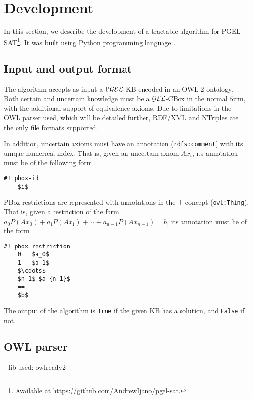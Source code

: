 
\chapter{Development}
\label{cap:development}

In this section, we describe the development of a tractable algorithm for PGEL-SAT\footnote{Available at \url{https://github.com/AndrewIjano/pgel-sat}.}. It was built using Python programming language \citep{python3}.

\section{Input and output format}

The algorithm accepts as input a $\text{P}\mathcal{GEL}$ KB encoded in an OWL 2 ontology. Both certain and uncertain knowledge must be a $\mathcal{GEL}$-CBox in the normal form, with the additional support of equivalence axioms. Due to limitations in the OWL parser used, which will be detailed further, RDF/XML and NTriples are the only file formats supported.

In addition, uncertain axioms must have an annotation (\texttt{rdfs:comment}) with its unique numerical index. That is, given an uncertain axiom $Ax_i$, its annotation must be of the following form
\begin{lstlisting}[style=mystyle]
	#! pbox-id
	$i$
\end{lstlisting}

PBox restrictions are represented with annotations in the $\top$ concept (\texttt{owl:Thing}). That is, given a restriction of the form $a_0 P(Ax_0) + a_1P(Ax_1) + \cdots + a_{n-1} P(Ax_{n-1}) = b$, its annotation must be of the form
\begin{lstlisting}[style=mystyle]
    #! pbox-restriction
    0   $a_0$
    1   $a_1$
    $\cdots$
    $n-1$ $a_{n-1}$
    ==
    $b$
\end{lstlisting}

The output of the algorithm is \texttt{True} if the given KB has a solution, and \texttt{False} if not.


\section{OWL parser}
- lib used: owlready2

